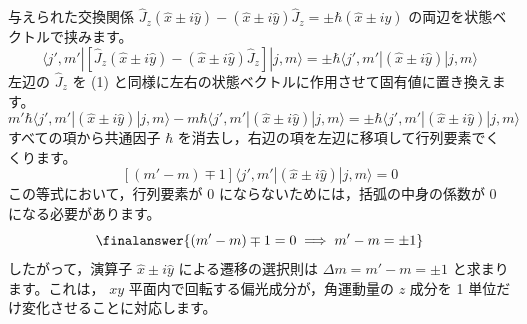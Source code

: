 \begin{solutionparts}
与えられた交換関係 $\hat{J}_z (\hat{x} \pm i\hat{y}) - (\hat{x} \pm i\hat{y})\hat{J}_z = \pm\hbar (\hat{x} \pm i\hat{y})$ の両辺を状態ベクトルで挟みます。
\begin{equation*}
\langle j', m'| \left[ \hat{J}_z (\hat{x} \pm i\hat{y}) - (\hat{x} \pm i\hat{y})\hat{J}_z \right] |j, m\rangle = \pm\hbar \langle j', m'| (\hat{x} \pm i\hat{y}) |j, m\rangle
\end{equation*}
左辺の $\hat{J}_z$ を (1) と同様に左右の状態ベクトルに作用させて固有値に置き換えます。
\begin{equation*}
m'\hbar \langle j', m'| (\hat{x} \pm i\hat{y}) |j, m\rangle - m\hbar \langle j', m'| (\hat{x} \pm i\hat{y}) |j, m\rangle = \pm\hbar \langle j', m'| (\hat{x} \pm i\hat{y}) |j, m\rangle
\end{equation*}
すべての項から共通因子 $\hbar$ を消去し，右辺の項を左辺に移項して行列要素でくくります。
\begin{equation*}
\left[ (m' - m) \mp 1 \right] \langle j', m'| (\hat{x} \pm i\hat{y}) |j, m\rangle = 0
\end{equation*}
この等式において，行列要素が 0 にならないためには，括弧の中身の係数が 0 になる必要があります。
\begin{equation*}
\finalanswer{(m' - m) \mp 1 = 0 \implies m' - m = \pm 1}
\end{equation*}
したがって，演算子 $\hat{x} \pm i\hat{y}$ による遷移の選択則は $\Delta m = m' - m = \pm 1$ と求まります。これは， $xy$ 平面内で回転する偏光成分が，角運動量の $z$ 成分を 1 単位だけ変化させることに対応します。

\end{solutionparts}
